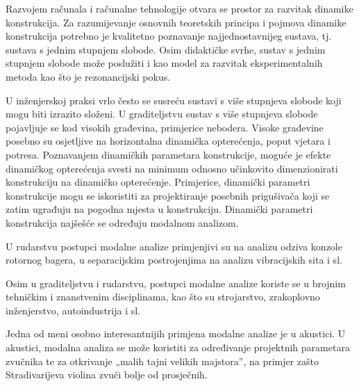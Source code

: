 Razvojem računala i računalne tehnologije otvara se prostor za razvitak dinamike
konstrukcija. Za razumijevanje osnovnih teoretskih principa i pojmova dinamike
konstrukcija potrebno je kvalitetno poznavanje najjednostavnijeg sustava, tj.
sustava s jednim stupnjem slobode. Osim didaktičke svrhe, sustav s jednim stupnjem
slobode može poslužiti i kao model za razvitak eksperimentalnih metoda kao što je
rezonancijski pokus. 
\par

U inženjerskoj praksi vrlo često se susreću sustavi s više stupnjeva slobode koji
mogu biti izrazito složeni. U graditeljstvu sustav s više stupnjeva slobode pojavljuje
se kod visokih građevina, primjerice nebodera. Visoke građevine posebno su osjetljive
na horizontalna dinamička opterećenja, poput vjetara i potresa. 
Poznavanjem dinamičkih parametara konstrukcije, moguće je efekte dinamičkog
opterećenja svesti na minimum odnosno učinkovito dimenzionirati konstrukciju na
dinamičko opterećenje. Primjerice, dinamički parametri konstrukcije mogu se 
iskoristiti za projektiranje posebnih prigušivača koji se zatim ugrađuju na pogodna 
mjesta u konstrukciju. Dinamički parametri konstrukcija najšešće se određuju
modalnom analizom.
\par

U rudarstvu postupci modalne analize primjenjivi su na analizu odziva konzole
rotornog bagera, u separacijskim postrojenjima na analizu vibracijskih sita i sl. 
\par

Osim u graditeljstvu i rudarstvu, postupci modalne analize koriste se u brojnim tehničkim i
znanstvenim disciplinama, kao što su strojarstvo, zrakoplovno inženjerstvo, autoindustrija
i sl.
\par

Jedna od meni osobno interesantnijih primjena modalne analize je u akustici. U
akustici, modalna analiza se može koristiti za određivanje projektnih parametara
zvučnika te za otkrivanje „malih tajni velikih majstora”, na primjer zašto
Stradivarijeva violina  zvuči bolje od prosječnih.


